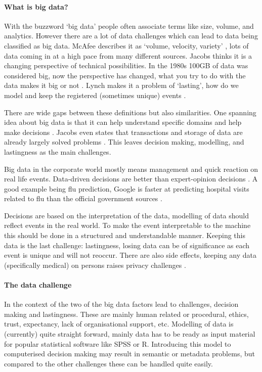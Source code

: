 \paragraph{What is big data?}
With the buzzword `big data' people often associate terms like size, volume, and analytics.
However there are a lot of data challenges which can lead to data being classified as big data.
McAfee describes it as `volume, velocity, variety' \cite{dsb1mcafee}, lots of data coming in at a high pace from many different sources.
Jacobs thinks it is a changing perspective of technical possibilities.
In the 1980s 100GB of data was considered big, now the perspective has changed, what you try to do with the data makes it big or not \cite{dsb5jacobs}.
Lynch makes it a problem of `lasting', how do we model and keep the registered (sometimes unique) events \cite{dsb3lynch}.

There are wide gaps between these definitions but also similarities.
One spanning idea about big data is that it can help understand specific domains and help make decisions \cite{dsb2lohr}.
Jacobs even states that transactions and storage of data are already largely solved problems \cite{dsb5jacobs}.
This leaves decision making, modelling, and lastingness as the main challenges.

Big data in the corporate world mostly means management and quick reaction on real life events.
Data-driven decisions are better than expert-opinion decisions \cite{dsb1mcafee}. 
A good example being flu prediction, Google is faster at predicting hospital visits related to flu than the official government sources \cite{dsb8dugas, dsb1mcafee}.

Decisions are based on the interpretation of the data, modelling of data should reflect events in the real world.
To make the event interpretable to the machine this should be done in a structured and understandable manner.
Keeping this data is the last challenge: lastingness, \eg{} losing data can be of significance as each event is unique and will not reoccur.
There are also side effects, keeping any data (specifically medical) on persons raises privacy challenges \cite{dsb1mcafee}.

\paragraph{The data challenge}
In the context of the \project{} two of the big data factors lead to challenges, decision making and lastingness.
These are mainly human related or procedural, \eg{} ethics, trust, expectancy, lack of organisational support, etc.
Modelling of data is (currently) quite straight forward, mainly data has to be ready as input material for popular statistical software like SPSS or R.
Introducing this model to computerised decision making may result in semantic or metadata problems, but compared to the other challenges these can be handled quite easily.

